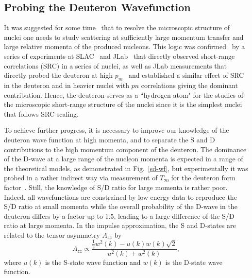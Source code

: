 \subsection{Probing the Deuteron Wavefunction}

It was suggested for some time~\cite{Frankfurt:1981mk} that to resolve the microscopic structure of nuclei one needs to study scattering at sufficiently large momentum transfer and large relative momenta of the produced nucleons. This logic was confirmed~\cite{Arrington:2011xs} by a series of experiments at SLAC~\cite{Frankfurt:1993sp} and JLab~\cite{Arrington:1998ps,Fomin:2011ng} that directly observed short-range correlations (SRC) in a series of nuclei, as well as JLab measurements that directly probed the deuteron at high $p_m$~\cite{Boeglin:2011mt, Boeglin:2015cha} and established a similar effect of SRC in the deuteron and in heavier nuclei with $pn$ correlations giving the dominant contribution.  Hence, the deuteron serves as a ``hydrogen atom" for the studies of the microscopic short-range structure of the nuclei since it is the simplest nuclei that follows SRC scaling.

To achieve further progress, it is necessary to improve our knowledge of the deuteron wave function at high momenta, and to separate the S and D contributions to the high momentum component of the deuteron. The dominance of the D-wave at a large range of the nucleon momenta is expected in a range of the theoretical models, as demonstrated in Fig.~\ref{sd-wf}, but experimentally it was probed in a rather indirect way via measurement of $T_{20}$ for the deuteron form factor~\cite{Garcon:2001sz}. Still, the knowledge of S/D ratio for large momenta is rather poor. Indeed, all wavefunctions are constrained by low energy data to reproduce the S/D ratio at small momenta while the overall probability of the D-wave in the deuteron differs by a factor up to 1.5, leading to a large difference of the S/D ratio at large momenta.
In the impulse approximation, the S and D-states are related to the tensor asymmetry $A_{zz}$ by~\cite{Frankfurt:1988nt}
\begin{equation}
	A_{zz} \propto \frac{\frac{1}{2}w^2(k)-u(k)w(k)\sqrt{2}}{u^2(k)+w^2(k)},
\end{equation}
where $u(k)$ is the S-state wave function and $w(k)$ is the D-state wave function. 

